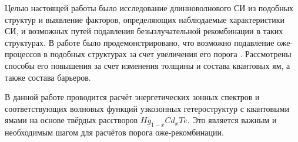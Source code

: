 \documentclass[../main.tex]{subfiles}
\begin{document}
Целью настоящей работы было исследование длинноволнового СИ из подобных структур и выявление факторов, определяющих наблюдаемые характеристики СИ, и возможных путей подавления 
безызлучательной рекомбинации в таких структурах. В работе было продемонстрировано, что возможно подавление оже-процессов в подобных структурах за счет увеличения его порога 
\cite{Rumyantsev:2019}. Рассмотрены 
способы его повышения за счет изменения толщины и состава квантовых ям, а также состава барьеров.

В данной работе проводится расчёт энергетических зонных спектров и соответствующих волновых функций узкозонных гетероструктур с квантовыми
ямами на основе твёрдых расстворов $Hg_{1-x}Cd_{x}Te$. Это является важным и необходимым шагом для расчётов порога оже-рекомбинации.
\end{document}
